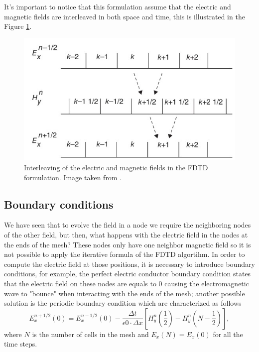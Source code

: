\documentclass[12pt, oneside]{book}
\begin{document}
It's important to notice that this formulation assume that the electric and magnetic fields are interleaved in both space and time, this is illustrated in the Figure \ref{fig:sullivaninterleaved}.
\begin{figure}[h]
    \centering
    \includegraphics[scale=0.8]{Imagenes/Sullivan_interleaved.jpg}
    \caption{Interleaving of the electric and magnetic fields in the FDTD formulation. Image taken from \cite{Sullivan2020}.}
    \label{fig:sullivaninterleaved}
\end{figure}
\subsection{Boundary conditions}

We have seen that to evolve the field in a node we require the neighboring nodes of the other field, but then, what happens with the electric field in the nodes at the ends of the mesh? These nodes only have one neighbor magnetic field so it is not possible to apply the iterative formula of the FDTD algortihm. In order to compute the electric field at those positions, it is necessary to introduce boundary conditions, for example, the perfect electric conductor boundary condition states that the electric field on these nodes are equals to $0$ causing the electromagnetic wave to "bounce" when interacting with the ends of the mesh; another possible solution is the periodic boundary condition which are characterized as follows
\begin{equation}
    E_x^{n+1/2}(0) = E_x^{n-1/2}(0) - \dfrac{\Delta t}{\epsilon 0 \cdot \Delta x}\left[H_{y}^{n}\left(\frac{1}{2}\right)-H_{y}^{n}\left(N-\frac{1}{2}\right)\right],
\end{equation} 
where $N$ is the number of cells in the mesh and $E_x(N) = E_x(0)$ for all the time steps.
\end{document}
